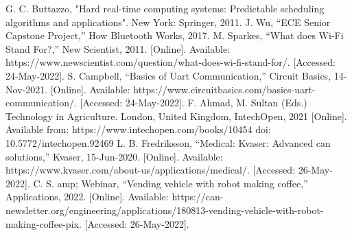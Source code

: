 \documentclass[conference]{IEEEtran}
\begin{document}
\begin{thebibliography}{00}
 G. C. Buttazzo, "Hard real-time computing systems: Predictable scheduling algorithms and applications". New York: Springer, 2011. 
  J. Wu, “ECE Senior Capstone Project,” How Bluetooth Works, 2017. 
  M. Sparkes, “What does Wi-Fi Stand For?,” New Scientist, 2011. [Online]. Available: https://www.newscientist.com/question/what-does-wi-fi-stand-for/. [Accessed: 24-May-2022]. 
  S. Campbell, “Basics of Uart Communication,” Circuit Basics, 14-Nov-2021. [Online]. Available: https://www.circuitbasics.com/basics-uart-communication/. [Accessed: 24-May-2022]. 
  F. Ahmad, M. Sultan (Eds.) Technology in Agriculture. London, United Kingdom, IntechOpen, 2021 [Online]. Available from: https://www.intechopen.com/books/10454 doi: 10.5772/intechopen.92469
 L. B. Fredriksson, “Medical: Kvaser: Advanced can solutions,” Kvaser, 15-Jun-2020. [Online]. Available: https://www.kvaser.com/about-us/applications/medical/. [Accessed: 26-May-2022].
 C. S. amp; Webinar, “Vending vehicle with robot making coffee,” Applications, 2022. [Online]. Available: https://can-newsletter.org/engineering/applications/180813-vending-vehicle-with-robot-making-coffee-pix. [Accessed: 26-May-2022].

\end{thebibliography}
\end{document}
